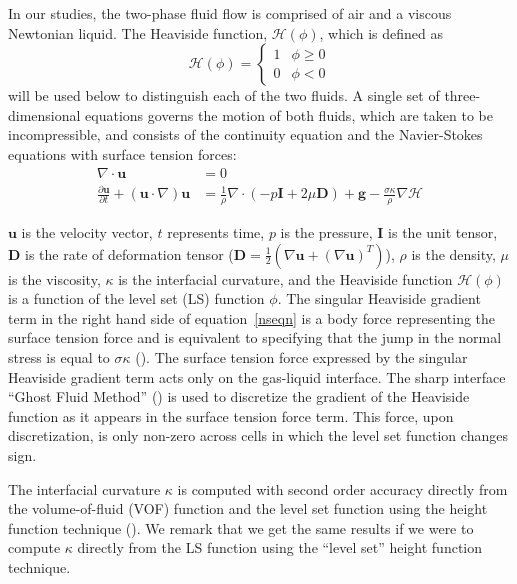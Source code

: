 \documentclass{elsarticle}
\newcommand{\Hea}{\mathcal{H}}
\newcommand{\vv}{\mathbf}
\newcommand{\bmD}{\vv{D}}
\newcommand{\bmg}{\vv{g}}
\newcommand{\bmI}{\vv{I}}
\newcommand{\bmu}{\vv{u}}
\begin{document}
\par 
In our studies, the two-phase fluid flow is comprised of air and a viscous Newtonian liquid.  The Heaviside function, $\Hea(\phi)$, which is defined as
\begin{equation}\label{heavyeqn}
  \Hea(\phi) = \begin{cases}
               1 & \phi \geq 0 \\
               0 & \phi <0 
               \end{cases}
\end{equation}
will be used below to distinguish each of the two fluids.  A single set of
three-dimensional equations governs the motion of both fluids, which are taken
to be incompressible, and consists of the continuity equation and the
Navier-Stokes equations with surface tension forces:
\begin{align}
  \nabla\cdot\bmu &=0  \label{divu} \\
  \frac{\partial\bmu}{\partial t}+(\bmu\cdot\nabla)\bmu &=
  \frac{1}{\rho}\nabla\cdot(-p\bmI+2\mu\bmD)+\bmg-
  \frac{\sigma\kappa}{\rho}\nabla \Hea  
  \label{nseqn}
\end{align}
%
%
\par
$\bmu$ is the velocity vector, $t$ represents time, $p$ is the pressure, $\bmI$ is the unit tensor, $\bmD$ is the rate of deformation tensor ($\bmD=\frac{1}{2}(\nabla\bmu+(\nabla\bmu)^{T})$), $\rho$ is the density, $\mu$ is the viscosity, $\kappa$ is the interfacial curvature, and the Heaviside function $\Hea(\phi)$ is a function of the level set (LS) function $\phi$. The singular Heaviside gradient term in the right hand side of equation~\eqref{nseqn} is a body force representing the surface tension force and is equivalent to specifying that the jump in the normal stress is equal to $\sigma\kappa$ (\citet{TanguyEtAl2007}).  The surface tension force expressed by the singular Heaviside gradient term acts only on the gas-liquid interface.  The sharp interface ``Ghost Fluid Method'' (\citet{KanFedLiu00}) is used to discretize the gradient of the Heaviside function as it appears in the surface tension force term.  This force, upon discretization, is only non-zero across cells in which the level set function changes sign.
\par
The interfacial curvature $\kappa$ is computed with second order accuracy directly from the volume-of-fluid (VOF) function and the level set function using the height function technique (\citet{Sus03,SusSmiHusOhtZhi07}).  We remark that we get the same results if we were to compute $\kappa$ directly from the LS function using the ``level set'' height function technique.
\end{document}
